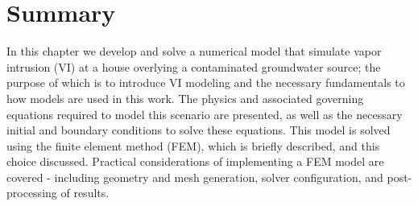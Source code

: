 \section{Summary}

In this chapter we develop and solve a numerical model that simulate vapor intrusion (VI) at a house overlying a contaminated groundwater source; the purpose of which is to introduce VI modeling and the necessary fundamentals to how models are used in this work.
The physics and associated governing equations required to model this scenario are presented, as well as the necessary initial and boundary conditions to solve these equations.
This model is solved using the finite element method (FEM), which is briefly described, and this choice discussed.
Practical considerations of implementing a FEM model are covered - including geometry and mesh generation, solver configuration, and post-processing of results.

